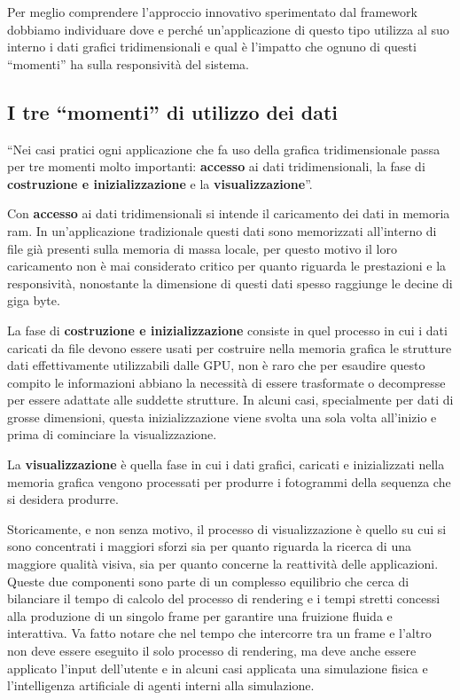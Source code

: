 Per meglio comprendere l'approccio innovativo sperimentato dal framework dobbiamo individuare dove e perch\'e un'applicazione di questo tipo utilizza al suo interno i dati grafici tridimensionali e qual \`e l'impatto che ognuno di questi ``momenti'' ha sulla responsivit\`a del sistema.

\subsection{I tre ``momenti'' di utilizzo dei dati}
``Nei casi pratici ogni applicazione che fa uso della grafica tridimensionale passa per tre momenti molto importanti: \textbf{accesso} ai dati tridimensionali, la fase di \textbf{costruzione e inizializzazione} e la \textbf{visualizzazione}''\cite{site:shadowframework}.

Con \textbf{accesso} ai dati tridimensionali si intende il caricamento dei dati in memoria ram. In un'applicazione tradizionale questi dati sono memorizzati all'interno di file gi\`a presenti sulla memoria di massa locale, per questo motivo il loro caricamento non \`e mai considerato critico per quanto riguarda le prestazioni e la responsivit\`a, nonostante la dimensione di questi dati spesso raggiunge le decine di giga byte. 

La fase di \textbf{costruzione e inizializzazione} consiste in quel processo in cui i dati caricati da file devono essere usati per costruire nella memoria grafica le strutture dati effettivamente utilizzabili dalle \ac{GPU}, non \`e raro che per esaudire questo compito le informazioni abbiano la necessit\`a di essere trasformate o decompresse per essere adattate alle suddette strutture.
In alcuni casi, specialmente per dati di grosse dimensioni, questa inizializzazione viene svolta una sola volta all'inizio e prima di cominciare la visualizzazione.

La \textbf{visualizzazione} \`e quella fase in cui i dati grafici, caricati e inizializzati nella memoria grafica vengono processati per produrre i fotogrammi della sequenza che si desidera produrre.

Storicamente, e non senza motivo, il processo di visualizzazione \`e quello su cui si sono concentrati i maggiori sforzi sia per quanto riguarda la ricerca di una maggiore qualit\`a visiva, sia per quanto concerne la reattivit\`a delle applicazioni.
Queste due componenti sono parte di un complesso equilibrio che cerca di bilanciare il tempo di calcolo del processo di rendering e i tempi stretti concessi alla produzione di un singolo frame per garantire una fruizione fluida e interattiva. Va fatto notare che nel tempo che intercorre tra un frame e l'altro non deve essere eseguito il solo processo di rendering, ma deve anche essere applicato l'input dell'utente e in alcuni casi applicata una simulazione fisica e l'intelligenza artificiale di agenti interni alla simulazione.

